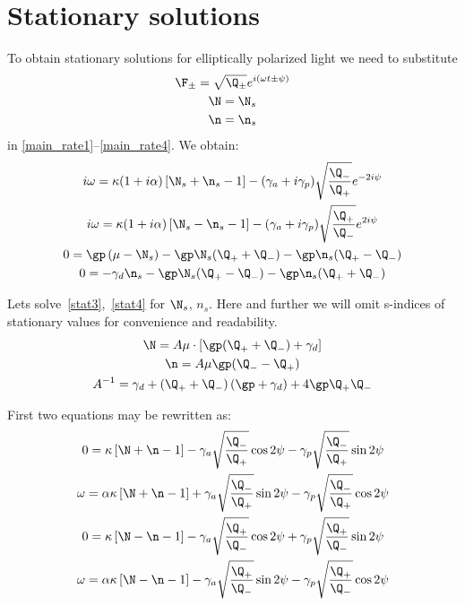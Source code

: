 \documentclass[12pt, notitlepage]{report}
\begin{document}
	\section{Stationary solutions}
	To obtain stationary solutions for elliptically polarized light we need to substitute
	\begin{gather*}
		\F_\pm = \sqrt{\Q_\pm} e^{i(\omega t \pm \psi)}\\
		\N = \N_s\\
		\n = \n_s
	\end{gather*}
	in \eqref{main_rate1}--\eqref{main_rate4}. We obtain:
	\begin{gather}
		\label{stat1}
		i\omega = \kappa(1+i\alpha)\left[\N_s+ \n_s - 1\right] - (\gamma_a + i\gamma_p) \sqrt{\frac{\Q_-}{\Q_+}} e^{- 2i\psi} \\
		\label{stat2}
		i\omega = \kappa(1+i\alpha)\left[\N_s - \n_s - 1\right] - (\gamma_a + i\gamma_p) \sqrt{\frac{\Q_+}{\Q_-}} e^{2i\psi} \\
		\label{stat3}
		0 = \gp\left(\mu-\N_s\right) - \gp\N_s(\Q_+ + \Q_-) - \gp\n_s(\Q_+ - \Q_-) \\
		\label{stat4}
		0 = -\gamma_d \n_s - \gp\N_s(\Q_+ - \Q_-) - \gp\n_s(\Q_+ + \Q_-)
	\end{gather}

Lets solve~\eqref{stat3},~\eqref{stat4} for $\N_s$, $n_s$. Here and further we will omit s-indices of stationary values for convenience and readability.
\begin{gather}
	\label{eq_N}
	\N = A\mu\cdot \left[\gp (\Q_+ + \Q_-) + \gamma_d\right] \\
	\label{eq_n}
	\n = A\mu\gp(\Q_- - \Q_+) \\
	A^{-1} = {\gamma_d + \left(\Q_+ +\Q_-\right)\left(\gp + \gamma_d\right) + 4\gp\Q_+\Q_-}
\end{gather}

	First two equations may be rewritten as:
	\begin{gather}
		\label{statir1}
		0 = \kappa \left[\N+ \n - 1\right] - \gamma_a \sqrt{\frac{\Q_-}{\Q_+}} \cos 2\psi - \gamma_p \sqrt{\frac{\Q_-}{\Q_+}} \sin 2\psi \\
		\label{statir2}
		\omega = \alpha\kappa \left[\N+ \n - 1\right] + \gamma_a \sqrt{\frac{\Q_-}{\Q_+}} \sin 2\psi - \gamma_p \sqrt{\frac{\Q_-}{\Q_+}} \cos 2\psi \\
		\label{statir3}
		0 = \kappa \left[\N - \n - 1\right] - \gamma_a \sqrt{\frac{\Q_+}{\Q_-}} \cos 2\psi + \gamma_p \sqrt{\frac{\Q_+}{\Q_-}} \sin 2\psi \\
		\label{statir4}
		\omega = \alpha\kappa \left[\N- \n - 1\right] - \gamma_a \sqrt{\frac{\Q_+}{\Q_-}} \sin 2\psi - \gamma_p \sqrt{\frac{\Q_+}{\Q_-}} \cos 2\psi
	\end{gather}
\end{document}
